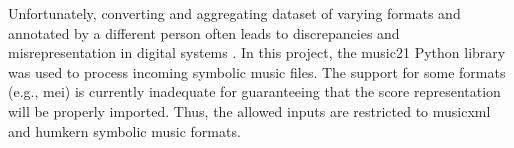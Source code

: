 

Unfortunately, converting and aggregating dataset of varying
formats and annotated by a different person often leads to
discrepancies and misrepresentation in digital systems
\parencite{napoleslopez2018encoding,
napoleslopez2019effects}. In this project, the music21
Python library \parencite{cuthbert2010music21} was used to
process incoming symbolic music files. The support for some
formats (e.g., \gls{mei}) is currently inadequate for
guaranteeing that the score representation will be properly
imported. Thus, the allowed inputs are restricted to
\gls{musicxml} and \gls{humkern} symbolic music formats.
